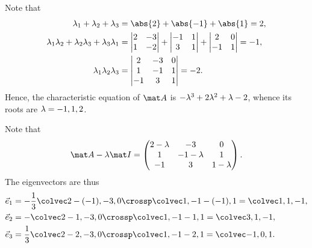 \begin{solution}
    Note that
    \begin{align*}
        \l_1 + \l_2 + \l_3 &= \abs{2} + \abs{-1} + \abs{1} = 2,\\
        \l_1 \l_2 + \l_2 \l_3 + \l_3 \l_1 &= \begin{vmatrix}2 & -3 \\ 1 & -2\end{vmatrix} + \begin{vmatrix}-1 & 1 \\ 3 & 1\end{vmatrix} + \begin{vmatrix}2 & 0 \\ -1 & 1\end{vmatrix} = -1, \\
        \l_1 \l_2 \l_3 &= \begin{vmatrix}2 & -3 & 0 \\ 1 & - 1 & 1 \\ - 1 & 3 & 1\end{vmatrix} = -2.
    \end{align*}
    Hence, the characteristic equation of $\mat A$ is $-\lambda^3 + 2 \lambda^2 + \lambda - 2$, whence its roots are $\lambda = -1, 1, 2$.

    Note that \[\mat A -\l \mat I = \begin{pmatrix}2 - \l & -3 & 0 \\ 1 & -1 -\l & 1 \\ -1 & 3 & 1 -\l\end{pmatrix}.\] The eigenvectors are thus
    \begin{align*}
        \vec e_1 &= -\frac13 \cveciii{2-(-1)}{-3}{0} \crossp \cveciii1{-1-(-1)}{1} = \cveciii11{-1},\\
        \vec e_2 &= -\cveciii{2-1}{-3}{0} \crossp \cveciii1{-1-1}{1} = \cveciii31{-1},\\
        \vec e_3 &= \frac13 \cveciii{2-2}{-3}{0} \crossp \cveciii1{-1-2}{1} = \cveciii{-1}01.
    \end{align*}


\end{solution}
